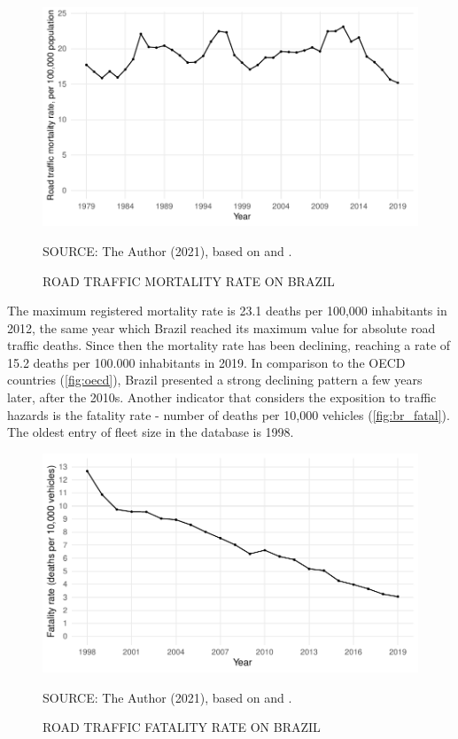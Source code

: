 \begin{figure}[!htbp]
    \centering\footnotesize
    \captionsetup{font=footnotesize}
    \caption{ROAD TRAFFIC MORTALITY RATE ON BRAZIL}
    \includegraphics{fig/brazil_mort.pdf}
    \label{fig:br_mort}
    \par SOURCE: The Author (2021), based on \textcite{MinistryofHealth2020} and \textcite{MinistryofHealth2021}.
\end{figure}

The maximum registered mortality rate is 23.1 deaths per 100,000 inhabitants in 2012, the same year which Brazil reached its maximum value for absolute road traffic deaths. Since then the mortality rate has been declining, reaching a rate of 15.2 deaths per 100.000 inhabitants in 2019. In comparison to the OECD countries (\autoref{fig:oecd}), Brazil presented a strong declining pattern a few years later, after the 2010s. Another indicator that considers the exposition to traffic hazards is the fatality rate - number of deaths per 10,000 vehicles (\autoref{fig:br_fatal}). The oldest entry of fleet size in the \textcite{DENATRAN2020} database is 1998.

\begin{figure}[!htbp]
    \centering\footnotesize
    \captionsetup{font=footnotesize}
    \caption{ROAD TRAFFIC FATALITY RATE ON BRAZIL}
    \includegraphics{fig/brazil_fatality.pdf}
    \label{fig:br_fatal}
    \par SOURCE: The Author (2021), based on \textcite{MinistryofHealth2020} and \textcite{DENATRAN2020}.
\end{figure}                                

